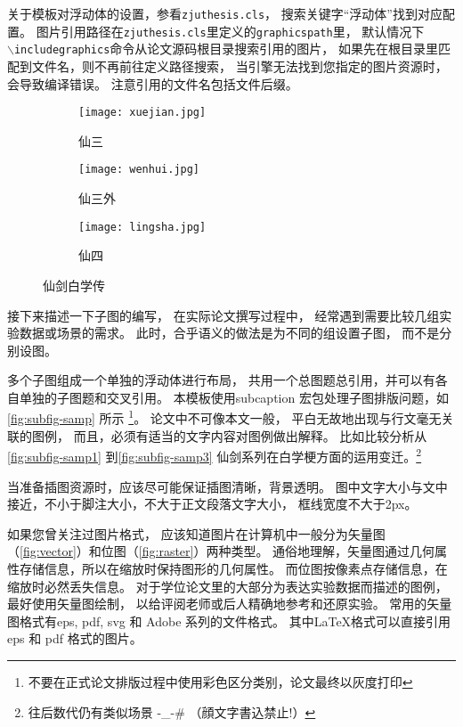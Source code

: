 关于模板对浮动体的设置，参看\texttt{zjuthesis.cls}，
搜索关键字“浮动体”找到对应配置。
图片引用路径在\texttt{zjuthesis.cls}里定义的\texttt{graphicspath}里，
默认情况下\\\texttt{$\backslash$includegraphics}命令从论文源码根目录搜索引用的图片，
如果先在根目录里匹配到文件名，则不再前往定义路径搜索，
当引擎无法找到您指定的图片资源时，会导致编译错误。
注意引用的文件名包括文件后缀。

\begin{figure}[htbp]
	\centering
	\begin{subfigure}[b]{.45\textwidth}  %
		\centering
		\texttt{[image: xuejian.jpg]}
		\caption{仙三}\label{fig:subfig-samp1}
	\end{subfigure}
	\begin{subfigure}[b]{.45\textwidth}
		\centering
		\texttt{[image: wenhui.jpg]}
		\caption{仙三外}\label{fig:subfig-samp2}
	\end{subfigure}
	\begin{subfigure}[b]{.45\textwidth}
		\centering
		\texttt{[image: lingsha.jpg]}
		\caption{仙四}\label{fig:subfig-samp3}
	\end{subfigure}
	\caption{仙剑白学传}\label{fig:subfig-samp}
\end{figure}

接下来描述一下子图的编写，
在实际论文撰写过程中，
经常遇到需要比较几组实验数据或场景的需求。
此时，合乎语义的做法是为不同的组设置子图，
而不是分别设图。

多个子图组成一个单独的浮动体进行布局，
共用一个总图题总引用，并可以有各自单独的子图题和交叉引用。
本模板使用subcaption 宏包处理子图排版问题，如\autoref{fig:subfig-samp} 所示
\footnote{不要在正式论文排版过程中使用彩色区分类别，论文最终以灰度打印}。
论文中不可像本文一般，
平白无故地出现与行文毫无关联的图例，
而且，必须有适当的文字内容对图例做出解释。
比如比较分析从\autoref{fig:subfig-samp1} 到\autoref{fig:subfig-samp3}
仙剑系列在白学梗方面的运用变迁。\footnote{往后数代仍有类似场景 -\_-\# （顔文字書込禁止!）}

当准备插图资源时，应该尽可能保证插图清晰，背景透明。
图中文字大小与文中接近，不小于脚注大小，不大于正文段落文字大小，
框线宽度不大于2px。

如果您曾关注过图片格式，
应该知道图片在计算机中一般分为矢量图（\autoref{fig:vector}）和位图（\autoref{fig:raster}）两种类型。
通俗地理解，矢量图通过几何属性存储信息，所以在缩放时保持图形的几何属性。
而位图按像素点存储信息，在缩放时必然丢失信息。
对于学位论文里的大部分为表达实验数据而描述的图例，最好使用矢量图绘制，
以给评阅老师或后人精确地参考和还原实验。
常用的矢量图格式有eps, pdf, svg 和 Adobe 系列的文件格式。
其中\LaTeX 格式可以直接引用eps 和 pdf 格式的图片。

